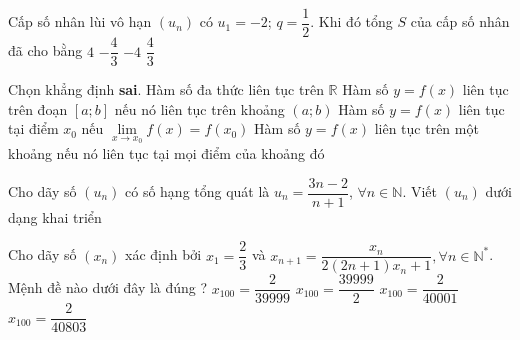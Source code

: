\begin{ex}%
	Cấp số nhân lùi vô hạn $\left(u_{n}\right)$ có $u_{1}=-2$; $q=\dfrac{1}{2}$. Khi đó tổng $S$ của cấp số  nhân đã cho bằng
	\choice 
		{$4$} 
		{$-\dfrac{4}{3}$} 
		 {\True $-4$}
		 {$\dfrac{4}{3}$}
\end{ex}

\begin{ex}%
	Chọn khẳng định  \textbf{sai}.
	 \choice
		{Hàm  số đa thức liên tục trên $\mathbb{R}$}
		{\True Hàm  số $y=f(x)$ liên tục trên đoạn $[a; b]$ nếu nó liên tục trên khoảng $(a; b)$}
		{Hàm số $y=f(x)$ liên  tục tại điểm $x_0$ nếu $\lim\limits_{x\to x_0} f(x)=f\left(x_0\right)$}
		{Hàm số $y=f(x)$ liên tục trên một khoảng nếu  nó liên tục tại mọi điểm của khoảng đó}
\end{ex}

\begin{bt}%
	Cho dãy  số $\left(u_n\right)$ có số hạng tổng quát là $u_n=\dfrac{3n-2}{n+1}$, $\forall n\in\mathbb{N}$. Viết $\left( u_n\right)$ dưới dạng khai triển
\end{bt}

\begin{ex}%
	Cho dãy số $\left(x_n\right)$ xác định bởi $x_1=\dfrac{2}{3}$ và ${x}_{n+1}=\dfrac{x_n}{2\left(2n+1\right)x_n+1},\forall n\in \mathbb{N}^*$. Mệnh đề nào  dưới đây là đúng ?
	 \choice
		 {\True$x_{100}=\dfrac{2}{39999}$}
		 {$x_{100}=\dfrac{39999}{2}$}
		 {$x_{100}=\dfrac{2}{40001}$}
		 {$x_{100}=\dfrac{2}{40803}$}
\end{ex}

